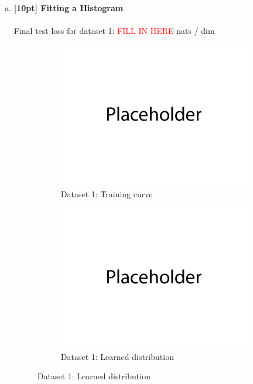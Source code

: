 \documentclass{article}
\begin{document}
\begin{enumerate}[(a)]

\item {\bf [10pt] Fitting a Histogram} \\\\
Final test loss for dataset 1: \textcolor{red}{FILL IN HERE}  nats / dim
\begin{figure}[H]
    \centering
    \begin{subfigure}{0.45\textwidth}
        \centering
        \includegraphics[width=\textwidth]{figures/placeholder.png}
        \caption{Dataset 1: Training curve}
    \end{subfigure}
    \hspace{0.2in}
    \begin{subfigure}{0.45\textwidth}
        \centering
        \includegraphics[width=\textwidth]{figures/placeholder.png}
        \caption{Dataset 1: Learned distribution}
    \end{subfigure}
\end{figure}


\end{enumerate}
\end{document}
